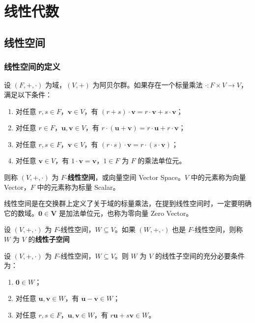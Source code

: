 \chapter{线性代数}

\section{线性空间}

\subsection{线性空间的定义}
\begin{definition}
    设 $ (F,+,\cdot) $ 为域，$ (V,+) $ 为阿贝尔群。如果存在一个标量乘法 $ \cdot: F\times V \to V $，满足以下条件：
    \begin{enumerate}
        \item 对任意 $ r,s\in F $，$ \mathbf{v}\in V $，有 $ (r+s)\cdot \mathbf{v} = r\cdot \mathbf{v} + s\cdot \mathbf{v} $；
        \item 对任意 $ r\in F $，$ \mathbf{u},\mathbf{v}\in V $，有 $ r\cdot (\mathbf{u}+\mathbf{v}) = r\cdot \mathbf{u} + r\cdot \mathbf{v} $；
        \item 对任意 $ r,s\in F $，$ \mathbf{v}\in V $，有 $ (r\cdot s)\cdot \mathbf{v} = r\cdot (s\cdot \mathbf{v}) $；
        \item 对任意 $ \mathbf{v}\in V $，有 $ 1\cdot \mathbf{v} = \mathbf{v} $，$1\in F$ 为 $ F $ 的乘法单位元。
    \end{enumerate}
    则称 $ (V,+,\cdot) $ 为 $ F $-\textbf{线性空间}，或向量空间 Vector Space。$V$ 中的元素称为向量 Vector，$F$ 中的元素称为标量 Scalar。
    \label{def:linear_space}
\end{definition}

\begin{note}
    线性空间是在交换群上定义了关于域的标量乘法，在提到线性空间时，一定要明确它的数域。$\mathbf{0}\in \mathbf{V}$ 是加法单位元，也称为零向量 Zero Vector。
\end{note}

\begin{definition}
    设 $ (V,+,\cdot) $ 为 $ F $-线性空间，$ W \subseteq V $。如果 $ (W,+,\cdot) $ 也是 $ F $-线性空间，则称 $ W $ 为 $ V $ 的\textbf{线性子空间}
    \label{def:linear_subspace}
\end{definition}

\begin{theorem}[线性子空间判定定理]
    设 $ (V,+,\cdot) $ 为 $ F $-线性空间，$ W \subseteq V $。则 $ W $ 为 $ V $ 的线性子空间的充分必要条件为：
    \begin{enumerate}
        \item $ \mathbf{0}\in W $；
        \item 对任意 $ \mathbf{u},\mathbf{v}\in W $，有 $ \mathbf{u}-\mathbf{v}\in W $；
        \item 对任意 $ r,s\in F $，$ \mathbf{u},\mathbf{v}\in W $，有 $ r \mathbf{u}+s \mathbf{v}\in W $。
    \end{enumerate}
    \label{thm:linear_subspace_judge}
\end{theorem}

